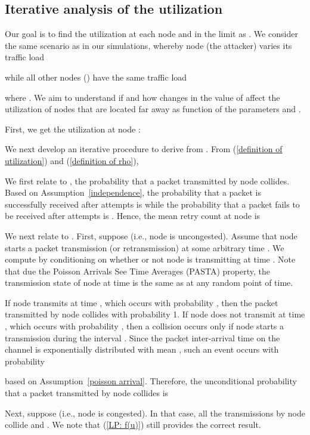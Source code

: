 \documentclass{IEEEtran}
\begin{document}
\subsection{Iterative analysis of the utilization}
\label{model}

Our goal is to find the utilization at each node  and in the limit as . We consider the same scenario as in our simulations,
whereby node  (the attacker) varies its traffic load

while all other nodes  () have the same traffic load

where .  We aim to understand if and how changes in the value of  affect the utilization of nodes that are located far away as
function of the parameters  and .

First, we get the utilization at node :


We next develop an iterative procedure to derive  from .
From (\ref{definition of utilization}) and (\ref{definition of rho}),



We first relate  to , the probability that a packet transmitted by node  collides.
Based on Assumption~\ref{independence}, the probability that a packet is successfully received after  attempts is
  while the probability that a packet  fails to be received after  attempts is . 
 Hence, the
mean retry count at node  is




We next relate   to . First, suppose  (i.e., node  is uncongested).   
Assume that node  starts a packet transmission (or retransmission) at some arbitrary time . We compute  by
conditioning on whether or not node  is transmitting at time .  Note that due the Poisson Arrivals See Time Averages (PASTA) property, the
transmission state of node  at time  is the same as at any random point of time. 

If node  transmits at time , which occurs with probability , then the packet transmitted by node  collides with probability 1. If node 
does not transmit at time , which occurs with probability , then a collision occurs only if  node  starts a transmission during the interval
. Since the packet inter-arrival time on the channel is exponentially distributed with mean , such an event
occurs with probability

based on Assumption~\ref{poisson arrival}. Therefore, the unconditional probability that a packet transmitted by node
 collides is



Next, suppose  (i.e., node  is congested). In that case, all the transmissions by node  collide and . We note that
(\ref{LP: f(u)}) still provides the correct result.
\end{document}
